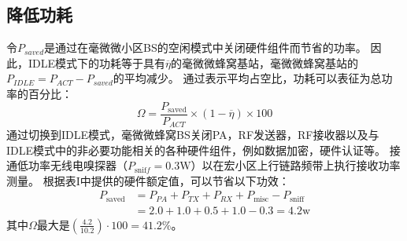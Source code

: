 \documentclass{article}
\begin{document}
\subsection{降低功耗}
令$ P_ {saved} $是通过在毫微微小区BS的空闲模式中关闭硬件组件而节省的功率。
因此，IDLE模式下的功耗等于具有$\overline{\eta}$的毫微微蜂窝基站，毫微微蜂窝基站的$P_{I D L E}=P_{A C T}-P_{s a v e d}$的平均减少。
通过表示平均占空比，功耗可以表征为总功率的百分比：$$
\Omega=\frac{P_{\text {saved}}}{P_{A C T}} \times(1-\overline{\eta}) \times 100
$$
通过切换到IDLE模式，毫微微蜂窝BS关闭PA，RF发送器，RF接收器以及与IDLE模式中的非必要功能相关的各种硬件组件，例如数据加密，硬件认证等。
接通低功率无线电嗅探器（$P_{\text {snif} f}=0.3 \mathrm{W}$）以在宏小区上行链路频带上执行接收功率测量。
根据表I中提供的硬件额定值，可以节省以下功效：$$
\begin{aligned} P_{\text {saved}} &=P_{P A}+P_{T X}+P_{R X}+P_{\text {misc}}-P_{\text {sniff}} \\ &=2.0+1.0+0.5+1.0-0.3=4.2 \mathrm{w} \end{aligned}
$$
其中$\Omega$最大是$\left(\frac{4.2}{10.2}\right) \cdot 100=41.2 \%$。
\end{document}
